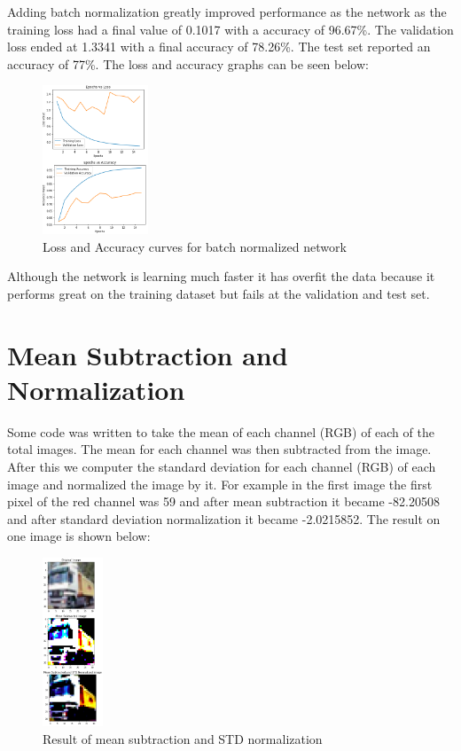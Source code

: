 \documentclass[conference]{IEEEtran}
\begin{document}
    Adding batch normalization greatly improved performance as the network as the
    training loss had a final value of 0.1017 with a accuracy of 96.67\%. The validation loss
    ended at 1.3341 with a final accuracy of 78.26\%. The test set reported an accuracy of 77\%.
    The loss and accuracy graphs can be seen below:

    \begin{figure}[H]
        \centering
        \captionsetup{justification=centering}
        \centering
            \includegraphics[width=0.28\textwidth]{5.png}
            \caption{Loss and Accuracy curves for batch normalized network}
    \end{figure}

    Although the network is learning much faster it has overfit the data because it performs great
    on the training dataset but fails at the validation and test set.

    \section{Mean Subtraction and Normalization}

    Some code was written to take the mean of each channel (RGB) of each of the total images.
    The mean for each channel was then subtracted from the image. After this we computer the standard
    deviation for each channel (RGB) of each image and normalized the image by it. For example in the first
    image the first pixel of the red channel was 59 and after mean subtraction it became -82.20508 and after
    standard deviation normalization it became -2.0215852. The result on one image is shown below:

    \begin{figure}[H]
        \centering
        \captionsetup{justification=centering}
        \centering
            \includegraphics[width=0.16\textwidth]{6.png}
            \caption{Result of mean subtraction and STD normalization}
    \end{figure}
\end{document}
